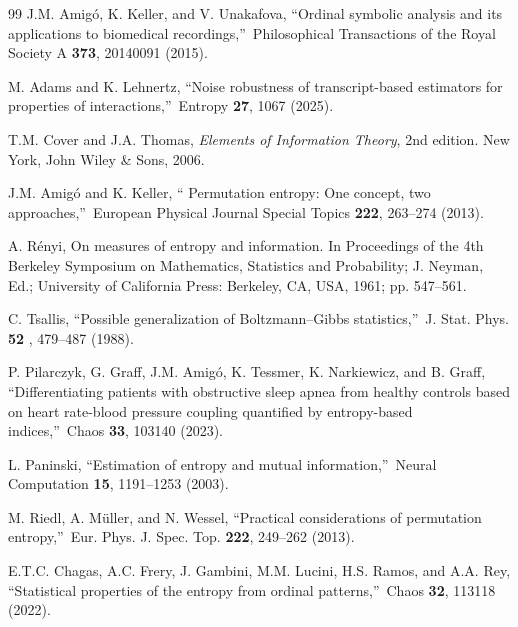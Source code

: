 \documentclass[%
 aip,
 amsmath,amssymb,
 reprint,%
]{revtex4-1}
\begin{document}
\begin{thebibliography}{99}
 J.M. Amig\'{o}, K. Keller, and V. Unakafova,
\textquotedblleft Ordinal symbolic analysis and its applications to
biomedical recordings,\textquotedblright\ Philosophical Transactions of the
Royal Society A \textbf{373}, 20140091 (2015).

 M. Adams and K. Lehnertz, \textquotedblleft Noise
robustness of transcript-based estimators for properties of
interactions,\textquotedblright\ Entropy \textbf{27}, 1067 (2025).

 T.M. Cover and J.A. Thomas, \textit{Elements of
Information Theory}, 2nd edition. New York, John Wiley \& Sons, 2006.

 J.M. Amig\'{o} and K. Keller, \textquotedblleft
Permutation entropy: One concept, two approaches,\textquotedblright\
European Physical Journal Special Topics \textbf{222}, 263--274 (2013).

 A. R\'{e}nyi, On measures of entropy and information. In
Proceedings of the 4th Berkeley Symposium on Mathematics, Statistics and
Probability; J. Neyman, Ed.; University of California Press: Berkeley, CA,
USA, 1961; pp. 547--561.

 C. Tsallis, \textquotedblleft Possible generalization
of Boltzmann--Gibbs statistics,\textquotedblright\ J. Stat. Phys. \textbf{52}%
, 479--487 (1988).

 P. Pilarczyk, G. Graff, J.M. Amig\'{o}, K. Tessmer,
K. Narkiewicz, and B. Graff, \textquotedblleft Differentiating patients with
obstructive sleep apnea from healthy controls based on heart rate-blood
pressure coupling quantified by entropy-based indices,\textquotedblright\
Chaos \textbf{33}, 103140 (2023).

 L. Paninski, \textquotedblleft Estimation of entropy
and mutual information,\textquotedblright\ Neural Computation \textbf{15}, 1191--1253
(2003).

 M. Riedl, A. M\"{u}ller, and N. Wessel,
\textquotedblleft Practical considerations of permutation
entropy,\textquotedblright\ Eur. Phys. J. Spec. Top. \textbf{222}, 249--262 (2013).

 E.T.C. Chagas, A.C. Frery, J. Gambini, M.M. Lucini,
H.S. Ramos, and A.A. Rey, \textquotedblleft Statistical properties of the
entropy from ordinal patterns,\textquotedblright\ Chaos \textbf{32}, 113118 (2022).


\end{thebibliography}
\end{document}

